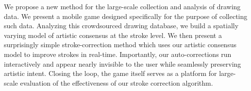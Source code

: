 
We propose a new method for the large-scale collection and analysis
of drawing data. We present a mobile game designed specifically for
the purpose of collecting such data. Analyzing this crowdsourced
drawing database, we build a spatially varying model of artistic
consensus at the stroke level. We then present a surprisingly simple
stroke-correction method which uses our artistic consensus model to
improve strokes in real-time. Importantly, our auto-corrections run
interactively and appear nearly invisible to the user while
seamlessly preserving artistic intent. Closing the loop, the game
itself serves as a platform for large-scale evaluation of the
effectiveness of our stroke correction algorithm.
